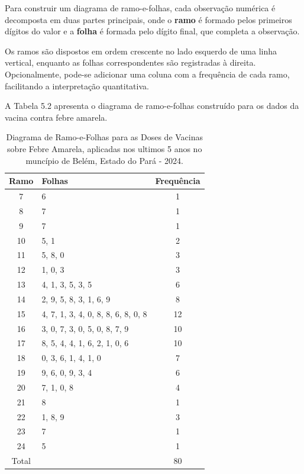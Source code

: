 Para construir um diagrama de ramo-e-folhas, cada observação numérica é
decomposta em duas partes principais, onde o \textbf{ramo} é formado pelos primeiros dígitos do valor e a \textbf{folha} é formada pelo dígito final, que completa a observação.


Os ramos são dispostos em ordem crescente no lado esquerdo de uma linha vertical,
enquanto as folhas correspondentes são registradas à direita.
Opcionalmente, pode-se adicionar uma coluna com a frequência de cada ramo,
facilitando a interpretação quantitativa. \vskip0.3cm

A Tabela 5.2 apresenta o diagrama de ramo-e-folhas construído
para os dados da vacina contra febre amarela.

\begin{table}[h]
    \centering
    {
    \caption{Diagrama de Ramo-e-Folhas para as Doses de Vacinas sobre Febre Amarela, aplicadas nos ultimos 5 anos no muncípio de Belém, Estado do Pará - 2024.}
    \label{ramosfolhas}
    \vspace{0.1cm}
\begin{tabular}{c|l|c}
\hline \hline
\textbf{Ramo} & \textbf{Folhas} & \textbf{Frequência} \\
\hline \hline 
 7  &  6                                   & 1  \\
 8  &  7                                   & 1  \\
 9  &  7                                   & 1  \\
 10 &  5, 1                                & 2  \\
 11 &  5, 8, 0                             & 3  \\
 12 &  1, 0, 3                             & 3  \\
 13 &  4, 1, 3, 5, 3, 5                    & 6  \\
 14 &  2, 9, 5, 8, 3, 1, 6, 9              & 8  \\
 15 &  4, 7, 1, 3, 4, 0, 8, 8, 6, 8, 0, 8  & 12 \\
 16 &  3, 0, 7, 3, 0, 5, 0, 8, 7, 9        & 10 \\
 17 &  8, 5, 4, 4, 1, 6, 2, 1, 0, 6        & 10 \\
 18 &  0, 3, 6, 1, 4, 1, 0                 & 7  \\
 19 &  9, 6, 0, 9, 3, 4                    & 6  \\
 20 &  7, 1, 0, 8                          & 4  \\
 21 &  8                                   & 1  \\
 22 &  1, 8, 9                             & 3  \\
 23 &  7                                   & 1  \\
 24 &  5                                   & 1  \\
 \hline
 Total   &                                 & 80 \\ 
 \hline \hline
\end{tabular}}
\end{table}




